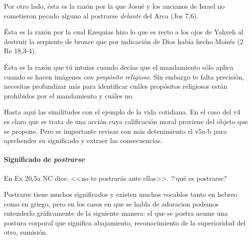 \documentclass{article}
\begin{document}
Por otro lado, \'esta es la raz\'on por la que Josu\'e y los ancianos de Israel no cometieron pecado alguno al postrarse \emph{delante} del Arca (Jos 7,6).

\'Esta es la raz\'on por la cual Ezequ\'{i}as hizo lo que es recto a los ojos de Yahveh al destruir la serpiente de bronce que por indicaci\'on de Dios hab\'{i}a hecho Mois\'es (2 Re 18,3-4).

\'Esta es la raz\'on que t\'u intu\'{i}as cuando dec\'{i}as que el mandamiento s\'olo aplica cuando se hacen im\'agenes \emph{con prop\'osito religioso}. Sin embargo te falta precisi\'on, necesitas profundizar m\'as para identificar cu\'ales prop\'ositos religiosos est\'an prohibidos por el mandamiento y cu\'ales no.

Hasta aqu\'{i} las similitudes con el ejemplo de la vida cotidiana. En el caso del v4 es claro que se trata de una acci\'on cuya calificaci\'on moral proviene del objeto que se propone. Pero es importante revisar con m\'as detenimiento el v5a-b para aprehender su significado y extraer las consecuencias.

\paragraph{Significado de \emph{postrarse}}

En Ex 20,5a NC dice: <<no te postrar\'as ante ellas>>. ?`qu\'e es postrarse?

Postrarse tiene muchos significados y existen muchos vocablos tanto en hebreo como en griego, pero en los casos en que se habla de adoracion podemos entenderlo gr\'aficamente de la siguiente manera: el que se postra asume una postura corporal que significa abajamiento, reconocimiento de la superioridad del otro, sumisi\'on.
\end{document}
